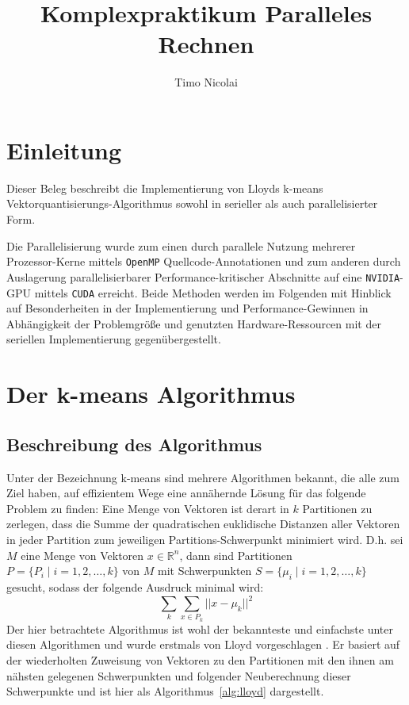 \documentclass[
    bibliography=totoc, cd=lightcolor, cdmath=false, ngerman]{tudscrreprt}
\begin{document}
\title{Komplexpraktikum Paralleles Rechnen}

\author{
  Timo Nicolai
}


\headingsvskip=-100pt

\maketitle
\tableofcontents
\pagebreak

\chapter{Einleitung}
Dieser Beleg beschreibt die Implementierung von Lloyds k-means
Vektorquantisierungs-Algorithmus sowohl in serieller als auch parallelisierter
Form.

Die Parallelisierung wurde zum einen durch parallele Nutzung mehrerer
Prozessor-Kerne mittels \texttt{OpenMP} Quellcode-Annotationen und zum anderen
durch Auslagerung parallelisierbarer Performance-kritischer Abschnitte auf eine
\texttt{NVIDIA}-GPU mittels \texttt{CUDA} erreicht. Beide Methoden werden im
Folgenden mit Hinblick auf Besonderheiten in der Implementierung und
Performance-Gewinnen in Abhängigkeit der Problemgröße und genutzten
Hardware-Ressourcen mit der seriellen Implementierung gegenübergestellt.

\chapter{Der k-means Algorithmus}

\section{Beschreibung des Algorithmus}

Unter der Bezeichnung k-means sind mehrere Algorithmen bekannt, die alle zum
Ziel haben, auf effizientem Wege eine annähernde Lösung für das folgende Problem
zu finden:
\bigbreak
Eine Menge von Vektoren ist derart in $k$ Partitionen zu zerlegen, dass die
Summe der quadratischen euklidische Distanzen aller Vektoren in jeder Partition
zum jeweiligen Partitions-Schwerpunkt minimiert wird. D.h. sei $M$ eine Menge
von Vektoren $x \in \mathbb{R}^n$, dann sind Partitionen $P = \{P_i \mid i =
1,2,\dots,k\}$ von $M$ mit Schwerpunkten $S = \{\mu_i \mid i = 1, 2, \dots,
k\}$ gesucht, sodass der folgende Ausdruck minimal wird:
$$
\sum_{k} \sum_{x \in P_k} ||x - \mu_k||^2
$$
Der hier betrachtete Algorithmus ist wohl der bekannteste und einfachste unter
diesen Algorithmen und wurde erstmals von Lloyd vorgeschlagen \cite{bib:lloyd}.
Er basiert auf der wiederholten Zuweisung von Vektoren zu den Partitionen mit
den ihnen am nähsten gelegenen Schwerpunkten und folgender Neuberechnung dieser
Schwerpunkte und ist hier als Algorithmus~\ref{alg:lloyd} dargestellt.
\end{document}
